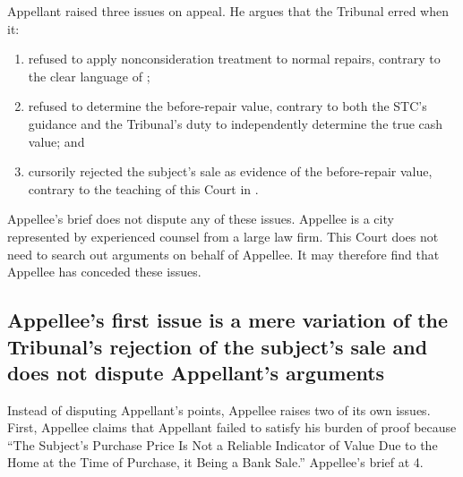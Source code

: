 \documentclass[12pt,\documentclassflag]{michiganCourtOfAppealsBrief}
\begin{document}
Appellant raised three issues on appeal. He argues that the Tribunal erred when it:

\begin{enumerate}
\item refused to apply nonconsideration treatment to normal repairs, contrary to the clear language of \mathieuGast;
\item refused to determine the before-repair value, contrary to both the STC's guidance and the Tribunal's duty to independently determine the true cash value; and
\item cursorily rejected the subject's sale as evidence of the before-repair value, contrary to the teaching of this Court in \cite{Jones & Laughlin}.
\end{enumerate}

Appellee's brief does not dispute any of these issues. Appellee is a city represented by experienced counsel from a large law firm. This Court does not need to search out arguments on behalf of Appellee. It may therefore find that Appellee has conceded these issues.


\subsection{Appellee's first issue is a mere variation of the Tribunal's rejection of the subject's sale and does not dispute Appellant's arguments}
 
Instead of disputing Appellant's points, Appellee raises two of its own issues. First, Appellee claims that Appellant failed to satisfy his burden of proof because ``The Subject's Purchase Price Is Not a Reliable Indicator of Value Due to the Home at the Time of Purchase, it Being a Bank Sale.'' Appellee's brief at 4.
\end{document}
